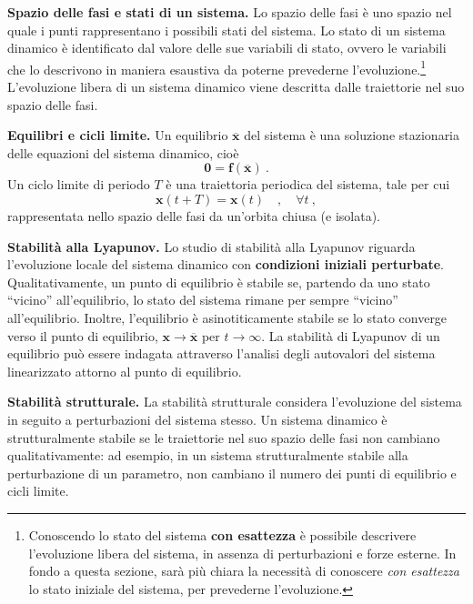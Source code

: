 \vspace{0.2cm}
\noindent
\textbf{Spazio delle fasi e stati di un sistema.}
 Lo spazio delle fasi è uno spazio nel quale i punti rappresentano i possibili stati del sistema. 
 Lo stato di un sistema dinamico è identificato dal valore delle sue variabili di stato,
 ovvero le variabili che lo descrivono in maniera esaustiva da poterne prevederne
 l'evoluzione.\footnote{Conoscendo lo stato del sistema \textbf{con esattezza}
 è possibile descrivere l'evoluzione libera del sistema, in assenza di perturbazioni
 e forze esterne. In fondo a  questa sezione, sarà più chiara la necessità di conoscere
\textit{con esattezza} lo stato iniziale del sistema, per prevederne l'evoluzione.}
L'evoluzione libera di un sistema dinamico viene descritta dalle traiettorie nel suo
 spazio delle fasi.

\vspace{0.2cm}
\noindent
\textbf{Equilibri e cicli limite.} Un equilibrio $\overline{\bm{x}}$ del sistema
 è una soluzione stazionaria delle equazioni del sistema dinamico, cioè 
\begin{equation}
 \bm{0} = \bm{f}(\overline{\bm{x}}) \ .
\end{equation}
Un ciclo limite di periodo $T$ è una traiettoria periodica del sistema, tale per cui
\begin{equation}
 \bm{x}(t+T) = \bm{x}(t) \quad , \quad \forall t \ ,
\end{equation}
rappresentata nello spazio delle fasi da un'orbita chiusa (e isolata).

\vspace{0.2cm}
\noindent
\textbf{Stabilità alla Lyapunov.}
Lo studio di stabilità alla Lyapunov riguarda l'evoluzione locale del sistema dinamico
 con \textbf{condizioni iniziali perturbate}. Qualitativamente, un punto di equilibrio è stabile
 se, partendo da uno stato ``vicino'' all'equilibrio, lo stato del sistema rimane per
 sempre ``vicino'' all'equilibrio. Inoltre, l'equilibrio è asinotiticamente stabile se
 lo stato converge verso il punto di equilibrio, $\bm{x} \rightarrow \bm{\overline{x}}$
 per $t \rightarrow \infty$.
\newline
 La stabilità di Lyapunov di un equilibrio può essere
 indagata attraverso l'analisi degli autovalori del sistema linearizzato attorno al punto
 di equilibrio.

\vspace{0.2cm}
\noindent
\textbf{Stabilità strutturale.}
La stabilità strutturale considera l'evoluzione del sistema in seguito a perturbazioni
 del sistema stesso. Un sistema dinamico è strutturalmente stabile se
 le traiettorie nel suo spazio delle fasi non cambiano qualitativamente: ad esempio, in un 
 sistema strutturalmente stabile alla perturbazione di un parametro,
 non cambiano il numero dei punti di equilibrio e cicli limite.


